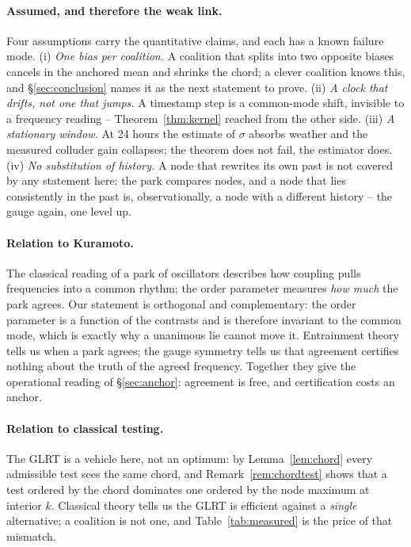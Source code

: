 \documentclass[10pt,twocolumn,a4paper]{article}
\theoremstyle{definition}
\theoremstyle{remark}
\begin{document}
\paragraph{Assumed, and therefore the weak link.} Four assumptions carry the
quantitative claims, and each has a known failure mode. (i) \emph{One bias per
coalition.} A coalition that splits into two opposite biases cancels in the
anchored mean and shrinks the chord; a clever coalition knows this, and
\S\ref{sec:conclusion} names it as the next statement to prove. (ii) \emph{A clock
that drifts, not one that jumps.} A timestamp step is a common-mode shift,
invisible to a frequency reading -- Theorem~\ref{thm:kernel} reached from the
other side. (iii) \emph{A stationary window.} At 24 hours the estimate of $\sigma$
absorbs weather and the measured colluder gain collapses; the theorem does not
fail, the estimator does. (iv) \emph{No substitution of history.} A node that
rewrites its own past is not covered by any statement here: the park compares
nodes, and a node that lies consistently in the past is, observationally, a node
with a different history -- the gauge again, one level up.

\paragraph{Relation to Kuramoto.} The classical reading of a park of oscillators
\cite{kuramoto1975} describes how coupling pulls frequencies into a common rhythm;
the order parameter measures \emph{how much} the park agrees. Our statement is
orthogonal and complementary: the order parameter is a function of the contrasts
and is therefore invariant to the common mode, which is exactly why a unanimous
lie cannot move it. Entrainment theory tells us when a park agrees; the gauge
symmetry tells us that agreement certifies nothing about the truth of the agreed
frequency. Together they give the operational reading of \S\ref{sec:anchor}:
agreement is free, and certification costs an anchor.

\paragraph{Relation to classical testing.} The GLRT is a vehicle here, not an
optimum: by Lemma~\ref{lem:chord} every admissible test sees the same chord, and
Remark~\ref{rem:chordtest} shows that a test ordered by the chord dominates one
ordered by the node maximum at interior $k$. Classical theory \cite{lehmann2005}
tells us the GLRT is efficient against a \emph{single} alternative; a coalition is
not one, and Table~\ref{tab:measured} is the price of that mismatch.
\end{document}
